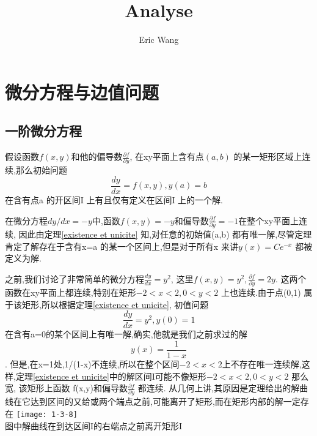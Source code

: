 \documentclass{book}
\begin{document}
\title{Analyse}
\author{Eric Wang}

\maketitle
\tableofcontents

\chapter{微分方程与边值问题}
\section{一阶微分方程}
\begin{theorem}[解的存在性和唯一性]
假设函数$f(x,y)$和他的偏导数$\frac{\partial f}{\partial y}$, 在xy平面上含有点$(a,b)$ 的某一矩形区域上连续,那么初始问题
\begin{equation}
\frac{dy}{dx}=f(x,y),y(a)=b
\end{equation}
在含有点a 的开区间I 上有且仅有定义在区间I 上的一个解.
\label{existence et unicite}
\end{theorem}

\begin{example}
在微分方程$dy/dx=-y$中,函数$f(x,y)=-y$和偏导数$\frac{\partial f}{\partial y}=-1$在整个xy平面上连续,
因此由定理\ref{existence et unicite} 知,对任意的初始值(a,b) 都有唯一解,尽管定理肯定了解存在于含有x=a 的某一个区间上,但是对于所有x 来讲$y(x)=Ce^{-x}$ 都被定义为解.
\end{example}

\begin{note}
之前,我们讨论了非常简单的微分方程$\frac{dy}{dx}=y^2$, 这里$f(x,y)=y^2,\frac{\partial f}{\partial y}=2y$.
这两个函数在xy平面上都连续,特别在矩形$-2<x<2,0<y<2 $ 上也连续.由于点(0,1) 属于该矩形,所以根据定理\ref{existence et unicite}, 初值问题
\begin{equation}
\frac{dy}{dx}=y^2,y(0)=1
\end{equation}
在含有a=0的某个区间上有唯一解,确实,他就是我们之前求过的解$$y(x)=\frac{1}{1-x}$$.
但是,在x=1处,1/(1-x)不连续,所以在整个区间$-2<x<2 $上不存在唯一连续解,这样,定理\ref{existence et unicite}中的解区间I可能不像矩形$-2<x<2,0<y<2$ 那么宽,
该矩形上函数 f(x,y)和偏导数$\frac{\partial f}{\partial y}$ 都连续.
从几何上讲,其原因是定理给出的解曲线在它达到区间的又给或两个端点之前,可能离开了矩形,而在矩形内部的解一定存在 \newline
\texttt{[image: 1-3-8]}\\
图中解曲线在到达区间I的右端点之前离开矩形I
\end{note}
\end{document}
